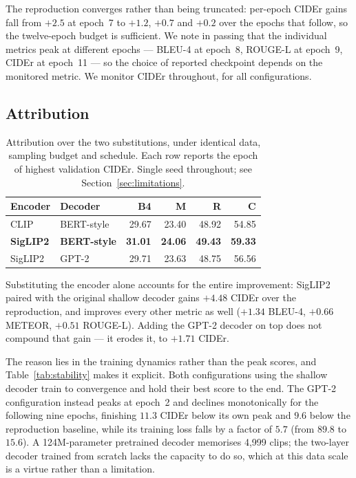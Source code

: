 \documentclass[10pt,twocolumn,letterpaper]{article}
\begin{document}
The reproduction converges rather than being truncated: per-epoch CIDEr gains fall from $+2.5$ at
epoch~7 to $+1.2$, $+0.7$ and $+0.2$ over the epochs that follow, so the twelve-epoch budget is
sufficient. We note in passing that the individual metrics peak at different epochs --- BLEU-4 at
epoch~8, ROUGE-L at epoch~9, CIDEr at epoch~11 --- so the choice of reported checkpoint depends on
the monitored metric. We monitor CIDEr throughout, for all configurations.

\subsection{Attribution}

\begin{table}[t]
\centering\small
\begin{tabular}{llrrrr}
\toprule
Encoder & Decoder & B4 & M & R & C \\
\midrule
CLIP    & BERT-style & 29.67 & 23.40 & 48.92 & 54.85 \\
\textbf{SigLIP2} & \textbf{BERT-style} & \textbf{31.01} & \textbf{24.06} & \textbf{49.43} & \textbf{59.33} \\
SigLIP2 & GPT-2 & 29.71 & 23.63 & 48.75 & 56.56 \\
\bottomrule
\end{tabular}
\caption{Attribution over the two substitutions, under identical data, sampling budget and
schedule. Each row reports the epoch of highest validation CIDEr. Single seed throughout; see
Section~\ref{sec:limitations}.}
\label{tab:main}
\end{table}

Substituting the encoder alone accounts for the entire improvement: SigLIP2 paired with the
original shallow decoder gains $+4.48$ CIDEr over the reproduction, and improves every other
metric as well ($+1.34$ BLEU-4, $+0.66$ METEOR, $+0.51$ ROUGE-L). Adding the GPT-2 decoder on
top does not compound that gain --- it erodes it, to $+1.71$ CIDEr.

The reason lies in the training dynamics rather than the peak scores, and
Table~\ref{tab:stability} makes it explicit. Both configurations using the shallow decoder train
to convergence and hold their best score to the end. The GPT-2 configuration instead peaks at
epoch~2 and declines monotonically for the following nine epochs, finishing $11.3$ CIDEr below
its own peak and $9.6$ below the reproduction baseline, while its training loss falls by a factor
of $5.7$ (from $89.8$ to $15.6$). A 124M-parameter pretrained decoder memorises 4,999 clips; the
two-layer decoder trained from scratch lacks the capacity to do so, which at this data scale is
a virtue rather than a limitation.
\end{document}
